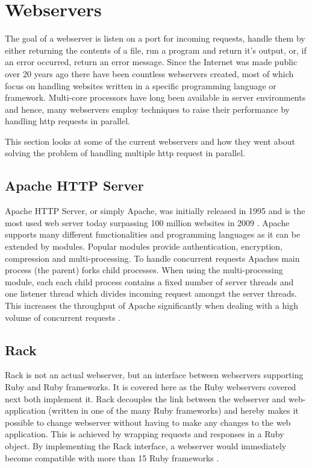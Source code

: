 \section{Webservers}
\label{webservers}

The goal of a webserver is listen on a port for incoming requests, handle them
by either returning the contents of a file, run a program and return it's
output, or, if an error occurred, return an error message. Since the Internet was
made public over 20 years ago there have been countless webservers created, most
of which focus on handling websites written in a specific programming language
or framework. Multi-core processors have long been available in server
environments and hence, many webservers employ techniques to raise their
performance by handling http requests in parallel.


This section looks at some of the current webservers and how they went about
solving the problem of handling multiple http request in parallel.

\subsection{Apache HTTP Server}
Apache HTTP Server, or simply Apache, was initially released in 1995 and is the
most used web server today surpassing 100 million websites in 2009
\cite{apachestats}. Apache supports many different functionalities and
programming languages as it can be extended by modules. Popular modules provide
authentication, encryption, compression and multi-processing. To handle
concurrent requests Apaches main process (the parent) forks child processes. 
When using the multi-processing module, each each child process contains a fixed 
number of server threads and one listener thread which divides incoming request
amongst the server threads. This increases the throughput of Apache
significantly when dealing with a high volume of concurrent requests
\cite{apachempm}.

\subsection{Rack}
Rack is not an actual webserver, but an interface between webservers supporting
Ruby and Ruby frameworks. It is covered here as the Ruby webservers covered next
both implement it. Rack decouples the link between the webserver and
web-application (written in one of the many Ruby frameworks) and hereby makes it
possible to change webserver without having to make any changes to the web
application. This is achieved by wrapping requests and responses in a Ruby
object. By implementing the Rack interface, a webserver would immediately become
compatible with more than 15 Ruby frameworks \cite{rackspec}.

